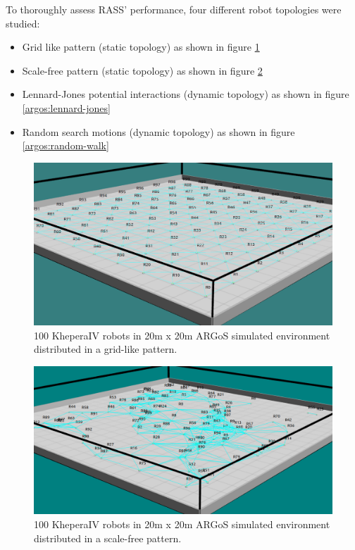 To thoroughly assess RASS' performance, four different robot topologies were studied:

\begin{itemize}
    \item Grid like pattern (static topology) as shown in figure \ref{argos:grid}
    \item Scale-free pattern (static topology) as shown in figure \ref{argos:scale-free}
    \item Lennard-Jones potential interactions (dynamic topology) as shown in figure \ref{argos:lennard-jones}
    \item Random search motions (dynamic topology) as shown in figure \ref{argos:random-walk}
\end{itemize}

\begin{figure}[htbp]
	\centering
    \includegraphics[width=\columnwidth]{images/argos_grid_link.png}
    \caption[Grid formation in ARGoS]{100 KheperaIV robots in 20m x 20m  ARGoS simulated environment distributed in a grid-like pattern.}
    \label{argos:grid}
\end{figure}

\begin{figure}[htbp]
	\centering
    \includegraphics[width=\columnwidth]{images/argos_scale_free.png}
    \caption[Scale-free formation in ARGoS]{100 KheperaIV robots in 20m x 20m  ARGoS simulated environment distributed in a scale-free pattern.}
    \label{argos:scale-free}
\end{figure}

